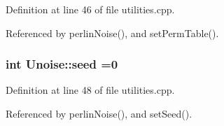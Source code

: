 Definition at line 46 of file utilities.\-cpp.



Referenced by perlin\-Noise(), and set\-Perm\-Table().

\hypertarget{namespace_unoise_ae6356ffd0fec247f6d19c762e1757fc3}{
\subsubsection[{seed}]{\setlength{\rightskip}{0pt plus 5cm}int Unoise\-::seed =0}}\label{namespace_unoise_ae6356ffd0fec247f6d19c762e1757fc3}


Definition at line 48 of file utilities.\-cpp.



Referenced by perlin\-Noise(), and set\-Seed().

